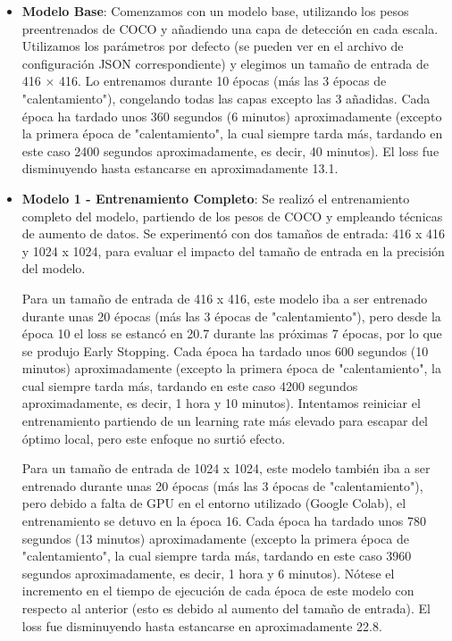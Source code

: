 \documentclass[10pt,twocolumn,letterpaper]{article}
\begin{document}
\begin{itemize}
    \item \textbf{Modelo Base}: Comenzamos con un modelo base, utilizando los pesos preentrenados de COCO y añadiendo una capa de detección en cada escala. Utilizamos los parámetros por defecto (se pueden ver en el archivo de configuración JSON correspondiente) y elegimos un tamaño de entrada de 416 × 416. Lo entrenamos durante 10 épocas (más las 3 épocas de "calentamiento"), congelando todas las capas excepto las 3 añadidas. Cada época ha tardado unos 360 segundos (6 minutos) aproximadamente (excepto la primera época de "calentamiento", la cual siempre tarda más, tardando en este caso 2400 segundos aproximadamente, es decir, 40 minutos). El loss fue disminuyendo hasta estancarse en aproximadamente 13.1. 

    \item \textbf{Modelo 1 - Entrenamiento Completo}: Se realizó el entrenamiento completo del modelo, partiendo de los pesos de COCO y empleando técnicas de aumento de datos. Se experimentó con dos tamaños de entrada: 416 x 416 y 1024 x 1024, para evaluar el impacto del tamaño de entrada en la precisión del modelo.
									      
Para un tamaño de entrada de 416 x 416, este modelo iba a ser entrenado durante unas 20 épocas (más las 3 épocas de "calentamiento"), pero desde la época 10 el loss se estancó en 20.7 durante las próximas 7 épocas, por lo que se produjo Early Stopping. Cada época ha 									      tardado unos 600 segundos (10 minutos) aproximadamente (excepto la primera época de "calentamiento", la cual siempre tarda más, tardando en este caso 4200 segundos aproximadamente, es decir, 1 hora y 10 minutos). Intentamos reiniciar el entrenamiento partiendo de un learning rate más elevado para escapar del óptimo local, pero este enfoque no surtió efecto.

Para un tamaño de entrada de 1024 x 1024, este modelo también iba a ser entrenado durante unas 20 épocas (más las 3 épocas de "calentamiento"), pero debido a falta de GPU en el entorno utilizado (Google Colab), el entrenamiento se detuvo en la época 16. Cada época ha tardado unos 780 segundos (13 minutos) aproximadamente (excepto la primera época de "calentamiento", la cual siempre tarda más, tardando en este caso 3960 segundos aproximadamente, es decir, 1 hora y 6 minutos). Nótese el incremento en el tiempo de ejecución de cada época de este modelo con respecto al anterior (esto es debido al aumento del tamaño de entrada). El loss fue disminuyendo hasta estancarse en aproximadamente 22.8.


\end{itemize}
\end{document}
